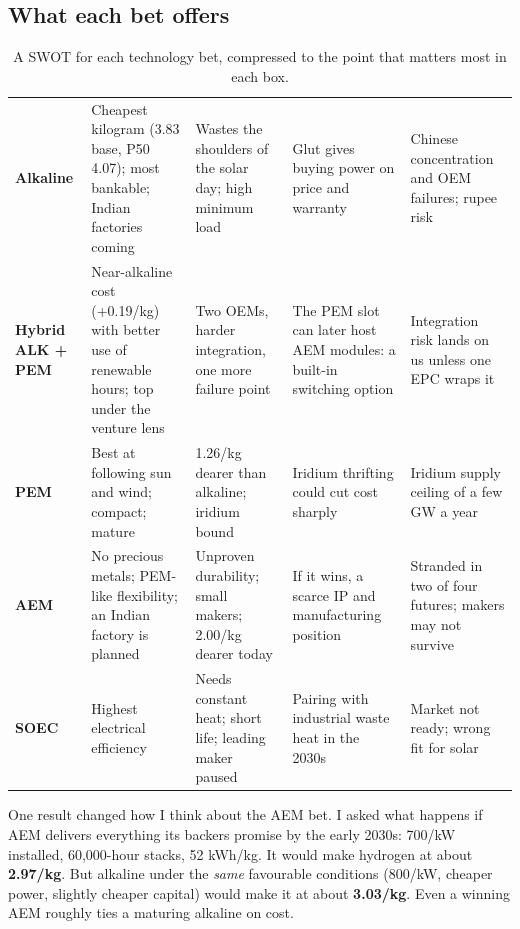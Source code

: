 \newpage
{}

\subsection{What each bet offers}\label{sec:bets}

\begin{table}[H]\centering\tablefont
\caption{A SWOT for each technology bet, compressed to the point that matters most in each box.}
\begin{tabularx}{\textwidth}{@{}p{17mm} L L L L@{}}
\toprule
{} &  &  &  & \\ \midrule
\textbf{Alkaline} & Cheapest kilogram (\usd{}3.83 base, P50 \usd{}4.07); most bankable; Indian factories coming & Wastes the shoulders of the solar day; high minimum load & Glut gives buying power on price and warranty & Chinese concentration and OEM failures; rupee risk\\
\textbf{Hybrid ALK + PEM} & Near-alkaline cost (+\usd{}0.19/kg) with better use of renewable hours; top under the venture lens & Two OEMs, harder integration, one more failure point & The PEM slot can later host AEM modules: a built-in switching option & Integration risk lands on us unless one EPC wraps it\\
\textbf{PEM} & Best at following sun and wind; compact; mature & \usd{}1.26/kg dearer than alkaline; iridium bound & Iridium thrifting could cut cost sharply & Iridium supply ceiling of a few GW a year\\
\textbf{AEM} & No precious metals; PEM-like flexibility; an Indian factory is planned & Unproven durability; small makers; \usd{}2.00/kg dearer today & If it wins, a scarce IP and manufacturing position & Stranded in two of four futures; makers may not survive\\
\textbf{SOEC} & Highest electrical efficiency & Needs constant heat; short life; leading maker paused & Pairing with industrial waste heat in the 2030s & Market not ready; wrong fit for solar\\
\bottomrule
\end{tabularx}
\end{table}

One result changed how I think about the AEM bet. I asked what happens if AEM delivers everything its backers promise by the early 2030s: \usd{}700/kW installed, 60,000-hour stacks, 52 kWh/kg. It would make hydrogen at about \textbf{\usd{}2.97/kg}. But alkaline under the \emph{same} favourable conditions (\usd{}800/kW, cheaper power, slightly cheaper capital) would make it at about \textbf{\usd{}3.03/kg}. Even a winning AEM roughly ties a maturing alkaline on cost. \confM

